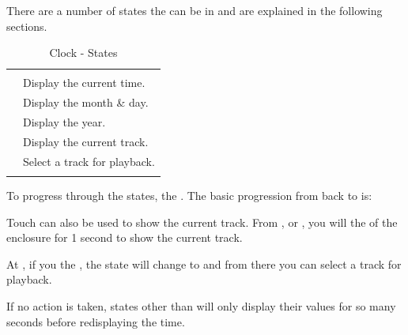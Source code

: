 There are a number of states the  can be in and are explained in the
following sections.

\begin{table}[H]
\centering
\begin{tabu} { X[1,c,m] | X[3,l,m] }
  \thrule
   &  \\ \mrule
   & Display the current time. \\ 
   & Display the month \& day. \\ 
   & Display the year.  \\ 
   & Display the current track. \\ 
   & Select a track for playback. \\
  \bhrule
\end{tabu}
\caption{Clock - States}
\end{table}

To progress through the states,  the .  The basic progression from
 back to  is:


Touch can also be used to show the current track.  From , 
or , you will  the  of the enclosure for \num{1} second
to show the current track.


At , if you  the , the state will change to  and
from there you can select a track for playback.


If no action is taken, states other than  will only display their
values for so many seconds before redisplaying the time.


